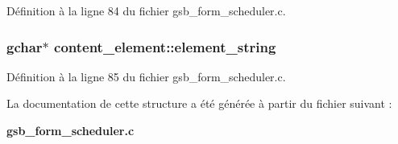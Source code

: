 Définition à la ligne 84 du fichier gsb\_\-form\_\-scheduler.c.

\subsubsection[{element\_\-string}]{\setlength{\rightskip}{0pt plus 5cm}gchar$\ast$ {\bf content\_\-element::element\_\-string}}\label{structcontent__element_aa5b1843fe75b2dc311f63d78db42a50e}


Définition à la ligne 85 du fichier gsb\_\-form\_\-scheduler.c.



La documentation de cette structure a été générée à partir du fichier suivant :\begin{DoxyCompactItemize}
\item 
{\bf gsb\_\-form\_\-scheduler.c}\end{DoxyCompactItemize}
